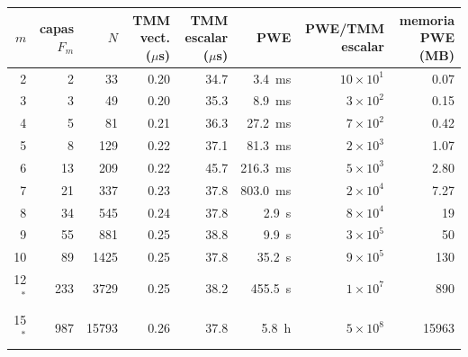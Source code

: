 \begin{tabular}{rrrrrrrr}
\toprule
$m$ & capas $F_m$ & $N$ & TMM vect. ($\mu$s) & TMM escalar ($\mu$s) & PWE & PWE/TMM escalar & memoria PWE (MB) \\
\midrule
2 & 2 & 33 & 0.20 & 34.7 & 3.4~ms & $10\times10^{1}$ & 0.07 \\
3 & 3 & 49 & 0.20 & 35.3 & 8.9~ms & $3\times10^{2}$ & 0.15 \\
4 & 5 & 81 & 0.21 & 36.3 & 27.2~ms & $7\times10^{2}$ & 0.42 \\
5 & 8 & 129 & 0.22 & 37.1 & 81.3~ms & $2\times10^{3}$ & 1.07 \\
6 & 13 & 209 & 0.22 & 45.7 & 216.3~ms & $5\times10^{3}$ & 2.80 \\
7 & 21 & 337 & 0.23 & 37.8 & 803.0~ms & $2\times10^{4}$ & 7.27 \\
8 & 34 & 545 & 0.24 & 37.8 & 2.9~s & $8\times10^{4}$ & 19 \\
9 & 55 & 881 & 0.25 & 38.8 & 9.9~s & $3\times10^{5}$ & 50 \\
10 & 89 & 1425 & 0.25 & 37.8 & 35.2~s & $9\times10^{5}$ & 130 \\
12$^*$ & 233 & 3729 & 0.25 & 38.2 & 455.5~s & $1\times10^{7}$ & 890 \\
15$^*$ & 987 & 15793 & 0.26 & 37.8 & 5.8~h & $5\times10^{8}$ & 15963 \\
\bottomrule
\end{tabular}
